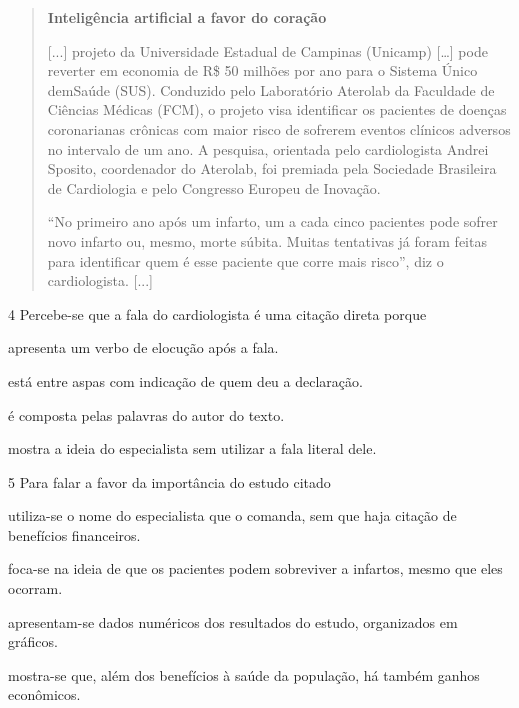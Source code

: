 \begin{quote}
\textbf{Inteligência artificial a favor do coração}


{[}...{]} projeto da Universidade Estadual de Campinas (Unicamp)
{[}\ldots{}{]} pode reverter em economia de R\$ 50 milhões por ano para
o Sistema Único demSaúde (SUS). Conduzido pelo Laboratório Aterolab da
Faculdade de Ciências Médicas (FCM), o projeto visa identificar os
pacientes de doenças coronarianas crônicas com maior risco de sofrerem
eventos clínicos adversos no intervalo de um ano. A pesquisa, orientada
pelo cardiologista Andrei Sposito, coordenador do Aterolab, foi premiada
pela Sociedade Brasileira de Cardiologia e pelo Congresso Europeu de
Inovação.

``No primeiro ano após um infarto, um a cada cinco pacientes pode sofrer
novo infarto ou, mesmo, morte súbita. Muitas tentativas já foram feitas
para identificar quem é esse paciente que corre mais risco'', diz o
cardiologista. {[}...{]}

\end{quote}

\num{4} Percebe-se que a fala do cardiologista é uma citação direta
porque

\begin{escolha}
\item apresenta um verbo de elocução após a fala.

\item está entre aspas com indicação de quem deu a declaração.

\item é composta pelas palavras do autor do texto.

\item mostra a ideia do especialista sem utilizar a fala literal dele.

\end{escolha}

\num{5} Para falar a favor da importância do estudo citado

\begin{escolha}
\item utiliza-se o nome do especialista que o comanda, sem que haja
citação de benefícios financeiros.

\item foca-se na ideia de que os pacientes podem sobreviver a infartos,
mesmo que eles ocorram.

\item apresentam-se dados numéricos dos resultados do estudo, organizados
em gráficos.

\item mostra-se que, além dos benefícios à saúde da população, há também
ganhos econômicos.
\end{escolha}


